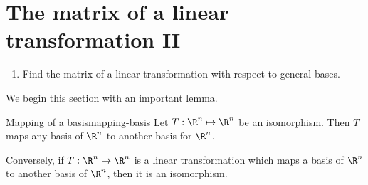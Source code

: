 \section{The matrix of a linear transformation II}


\begin{outcome}
  \begin{enumerate}
  \item Find the matrix of a linear transformation with respect to
    general bases.
  \end{enumerate}
\end{outcome}

We begin this section with an important lemma. 

\begin{lemma}{Mapping of a basis}{mapping-basis}
Let $T: \R^n \mapsto \R^n$ be an isomorphism.  Then $T$ maps any basis of
$\R^n$ to another basis for $\R^n$. 

Conversely, if $T:
\R^n \mapsto \R^n$ is a linear transformation which
maps a basis of $\R^n$ to another basis of $\R^n$,
then it is an isomorphism.
\end{lemma}


